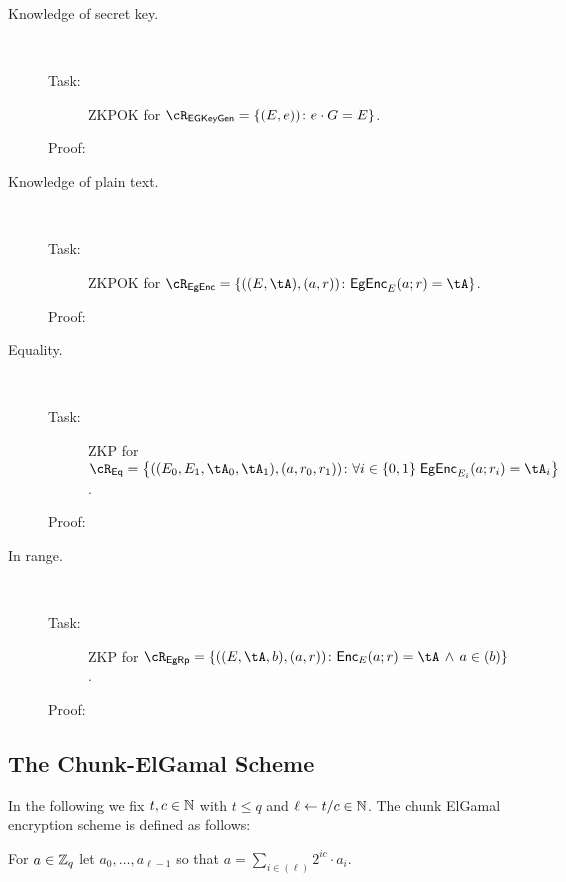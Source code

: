 	
\begin{description}
	\item[Knowledge of secret key.] ~
    


\begin{description}
	\item[Task:] ZKPOK for $\rEgKeyGen = \rEgKeyGenDef$.
	
\item[Proof:] 
\end{description}


\item[Knowledge of plain text.] ~

\begin{description}
	\item[Task:] ZKPOK for $\rEGEnc=\rEGEncDef$.
	
	\item[Proof:] 
	
\end{description}


\item[Equality.] ~
\begin{description}
	\item[Task:] ZKP for $\rEgEq =\rEgEqDef$.
	
	\item[Proof:] 
\end{description}


\item[In range.] ~
\begin{description}
	\item[Task:] ZKP for $\rEgRp =\rEgRpDef$.
	
	\item[Proof:] 
\end{description}



\end{description}

	
\subsection{The Chunk-ElGamal  Scheme}\label{sec:ChanksEG:EGScheme}
In the following we fix $t,c\in {\mathbb{N}}$ with $t\le q$ and $\ell \leftarrow t/c \in {\mathbb{N}}$. The chunk ElGamal encryption scheme  is defined as follows:


\newcommand{\basefactor}{\MathAlgX{baseF}}
\begin{definition}\label{def:basefactor}
For $a\in {\mathbb Z}_q$ let $a_0,\ldots,a_{\ell-1}$ so that $a =  \sum_{i \in (\ell)}    2^{i c} \cdot a_i$.
\end{definition}


